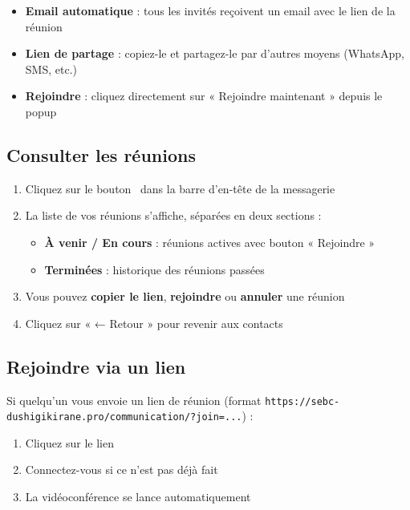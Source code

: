 \documentclass[12pt,a4paper]{article}
\begin{document}
\begin{itemize}
    \item \textbf{Email automatique} : tous les invités reçoivent un email avec le lien de la réunion
    \item \textbf{Lien de partage} : copiez-le et partagez-le par d'autres moyens (WhatsApp, SMS, etc.)
    \item \textbf{Rejoindre} : cliquez directement sur « Rejoindre maintenant » depuis le popup
\end{itemize}

\subsection{Consulter les réunions}

\begin{etapebox}
\begin{enumerate}[leftmargin=1.5em]
    \item Cliquez sur le bouton \faVideo\ dans la barre d'en-tête de la messagerie
    \item La liste de vos réunions s'affiche, séparées en deux sections :
    \begin{itemize}
        \item \textbf{À venir / En cours} : réunions actives avec bouton « Rejoindre »
        \item \textbf{Terminées} : historique des réunions passées
    \end{itemize}
    \item Vous pouvez \textbf{copier le lien}, \textbf{rejoindre} ou \textbf{annuler} une réunion
    \item Cliquez sur « ← Retour » pour revenir aux contacts
\end{enumerate}
\end{etapebox}

\subsection{Rejoindre via un lien}

Si quelqu'un vous envoie un lien de réunion (format \texttt{https://sebc-dushigikirane.pro/communication/?join=...}) :

\begin{enumerate}
    \item Cliquez sur le lien
    \item Connectez-vous si ce n'est pas déjà fait
    \item La vidéoconférence se lance automatiquement
\end{enumerate}
\end{document}
